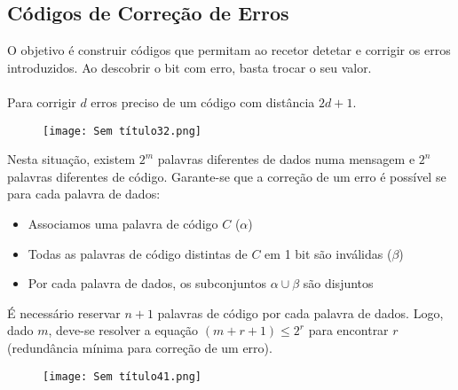 \documentclass[10pt,a4paper]{report}
\begin{document}
\subsection{Códigos de Correção de Erros}
O objetivo é construir códigos que permitam ao recetor detetar e corrigir os erros
introduzidos. Ao descobrir o bit com erro, basta trocar o seu valor.\\
\\
Para corrigir $d$ erros preciso de um código com distância $2d+1$.
\begin{figure}[H]
\centering
\texttt{[image: Sem título32.png]}
\end{figure}
Nesta situação, existem $2^m$ palavras diferentes de dados numa mensagem e $2^n$ palavras diferentes de código. Garante-se que a correção de um erro é possível se para cada palavra de dados:
\begin{itemize}
\item Associamos uma palavra de código $C$ ($\alpha$)
\item Todas as palavras de código distintas de $C$ em 1 bit são inválidas ($\beta$)
\item Por cada palavra de dados, os subconjuntos $\alpha \cup \beta$ são disjuntos
\end{itemize}
É necessário reservar $n+1$ palavras de código por cada palavra de dados. Logo, dado $m$, deve-se resolver a equação $(m + r + 1) \leq 2^r$ para encontrar $r$ (redundância mínima para correção de um erro).
\begin{figure}[H]
\centering
{}%
\end{figure}
\begin{figure}[H]
\centering
\texttt{[image: Sem título41.png]}
\end{figure}
\end{document}
